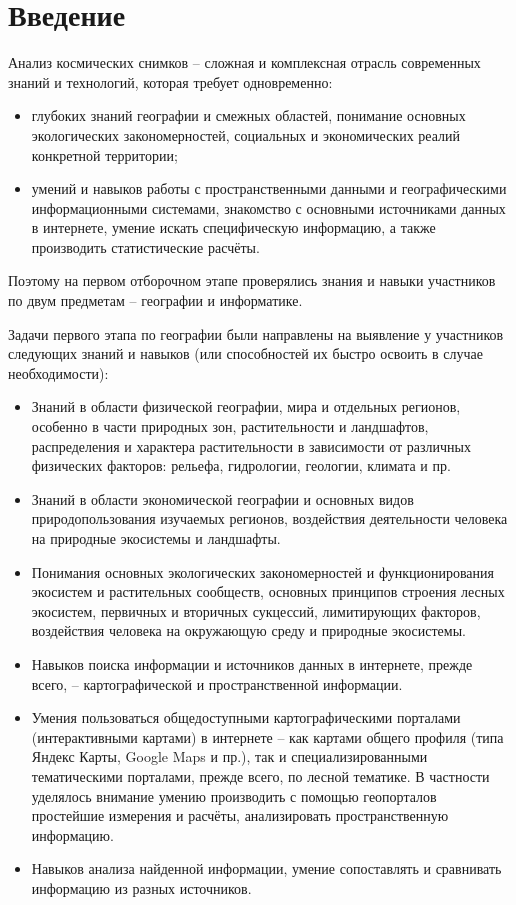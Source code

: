 %
\begingroup
\pagestyle{empty}

\section*{Введение}

Анализ космических снимков – сложная и комплексная отрасль современных знаний и технологий, которая требует одновременно:
\begin{itemize}
    \item глубоких знаний географии и смежных областей, понимание основных экологических закономерностей, социальных и экономических реалий конкретной территории; 
    \item умений и навыков работы с пространственными данными и географическими информационными системами, знакомство с основными источниками данных в интернете, умение искать специфическую информацию, а также производить статистические расчёты.
\end{itemize}

Поэтому на первом отборочном этапе проверялись знания и навыки участников по двум предметам – географии и информатике. 

Задачи первого этапа по географии были направлены на выявление у участников следующих знаний и навыков (или способностей их быстро освоить в случае необходимости):
\begin{itemize}
    \item Знаний в области физической географии, мира и отдельных регионов, особенно в части природных зон, растительности и ландшафтов, распределения и характера растительности в зависимости от различных физических факторов: рельефа, гидрологии, геологии, климата и пр.
    \item Знаний в области экономической географии и основных видов природопользования изучаемых регионов, воздействия деятельности человека на природные экосистемы и ландшафты.
    \item Понимания основных экологических закономерностей и функционирования экосистем и растительных сообществ, основных принципов строения лесных экосистем, первичных и вторичных сукцессий, лимитирующих факторов, воздействия человека на окружающую среду и природные экосистемы.
    \item Навыков поиска информации и источников данных в интернете, прежде всего, – картографической и пространственной информации.
    \item Умения пользоваться общедоступными картографическими порталами (интерактивными картами) в интернете – как картами общего профиля (типа Яндекс Карты, Google Maps и пр.), так и специализированными тематическими порталами, прежде всего, по лесной тематике. В частности уделялось внимание умению производить с помощью геопорталов простейшие измерения и расчёты, анализировать пространственную информацию.
    \item Навыков анализа найденной информации, умение сопоставлять и сравнивать информацию из разных источников.
\end{itemize}

